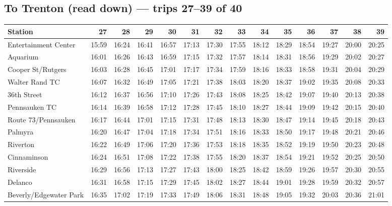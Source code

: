 \subsection*{To Trenton (read down) --- trips 27--39 of 40}
\begin{center}\footnotesize\setlength{\tabcolsep}{3pt}\begin{tabular}{@{}lrrrrrrrrrrrrr@{}}\toprule
Station & 27 & 28 & 29 & 30 & 31 & 32 & 33 & 34 & 35 & 36 & 37 & 38 & 39 \\\midrule
Entertainment Center & 15:59 & 16:24 & 16:41 & 16:57 & 17:13 & 17:30 & 17:55 & 18:12 & 18:29 & 18:54 & 19:27 & 20:00 & 20:25 \\
Aquarium & 16:01 & 16:26 & 16:43 & 16:59 & 17:15 & 17:32 & 17:57 & 18:14 & 18:31 & 18:56 & 19:29 & 20:02 & 20:27 \\
Cooper St/Rutgers & 16:03 & 16:28 & 16:45 & 17:01 & 17:17 & 17:34 & 17:59 & 18:16 & 18:33 & 18:58 & 19:31 & 20:04 & 20:29 \\
Walter Rand TC & 16:07 & 16:32 & 16:49 & 17:05 & 17:21 & 17:38 & 18:03 & 18:20 & 18:37 & 19:02 & 19:35 & 20:08 & 20:33 \\
36th Street & 16:12 & 16:37 & 16:56 & 17:10 & 17:26 & 17:43 & 18:08 & 18:25 & 18:42 & 19:07 & 19:40 & 20:13 & 20:38 \\
Pennsauken TC & 16:14 & 16:39 & 16:58 & 17:12 & 17:28 & 17:45 & 18:10 & 18:27 & 18:44 & 19:09 & 19:42 & 20:15 & 20:40 \\
Route 73/Pennsauken & 16:17 & 16:44 & 17:01 & 17:15 & 17:31 & 17:48 & 18:13 & 18:30 & 18:47 & 19:14 & 19:45 & 20:18 & 20:43 \\
Palmyra & 16:20 & 16:47 & 17:04 & 17:18 & 17:34 & 17:51 & 18:16 & 18:33 & 18:50 & 19:17 & 19:48 & 20:21 & 20:46 \\
Riverton & 16:22 & 16:49 & 17:06 & 17:20 & 17:36 & 17:53 & 18:18 & 18:35 & 18:52 & 19:19 & 19:50 & 20:23 & 20:48 \\
Cinnaminson & 16:24 & 16:51 & 17:08 & 17:22 & 17:38 & 17:55 & 18:20 & 18:37 & 18:54 & 19:21 & 19:52 & 20:25 & 20:50 \\
Riverside & 16:29 & 16:56 & 17:13 & 17:27 & 17:43 & 18:00 & 18:25 & 18:42 & 18:59 & 19:26 & 19:57 & 20:30 & 20:55 \\
Delanco & 16:31 & 16:58 & 17:15 & 17:29 & 17:45 & 18:02 & 18:27 & 18:44 & 19:01 & 19:28 & 19:59 & 20:32 & 20:57 \\
Beverly/Edgewater Park & 16:35 & 17:02 & 17:19 & 17:33 & 17:49 & 18:06 & 18:31 & 18:48 & 19:05 & 19:32 & 20:03 & 20:36 & 21:01 \\

\end{tabular}
\end{center}

